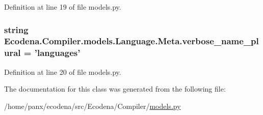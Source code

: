 Definition at line 19 of file models.py.

\hypertarget{class_ecodena_1_1_compiler_1_1models_1_1_language_1_1_meta_a73f1a2a1b08628a1086c57fb2a99ef25}{
\subsubsection[{verbose\_\-name\_\-plural}]{\setlength{\rightskip}{0pt plus 5cm}string {\bf Ecodena.Compiler.models.Language.Meta.verbose\_\-name\_\-plural} = 'languages'}}
\label{da/d0f/class_ecodena_1_1_compiler_1_1models_1_1_language_1_1_meta_a73f1a2a1b08628a1086c57fb2a99ef25}


Definition at line 20 of file models.py.



The documentation for this class was generated from the following file:\begin{DoxyCompactItemize}
\item 
/home/panx/ecodena/src/Ecodena/Compiler/\hyperlink{_compiler_2models_8py}{models.py}\end{DoxyCompactItemize}
